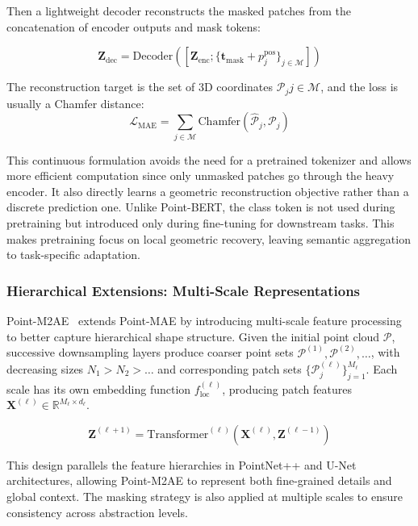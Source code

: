 Then a lightweight decoder reconstructs the masked patches from the concatenation of encoder outputs and mask tokens:

\begin{equation}
  \mathbf{Z}_\text{dec}=\text{Decoder}([\mathbf{Z}_\text{enc}; \{\mathbf{t}_{\text{mask}}+p_j^\text{pos}\}_{j \in \mathcal{M}}])
\end{equation}

The reconstruction target is the set of 3D coordinates ${\mathcal{P}_j}{j \in \mathcal{M}}$, and the loss is usually a Chamfer distance:
\begin{equation}
  \mathcal{L}_{\text{MAE}} = \sum_{j \in \mathcal{M}} \text{Chamfer}(\hat{\mathcal{P}}_j, \mathcal{P}_j)
\end{equation}

This continuous formulation avoids the need for a pretrained tokenizer and allows more efficient computation since only unmasked patches go through the heavy encoder. It also directly learns a geometric reconstruction objective rather than a discrete prediction one. Unlike Point-BERT, the class token is not used during pretraining but introduced only during fine-tuning for downstream tasks. This makes pretraining focus on local geometric recovery, leaving semantic aggregation to task-specific adaptation.

\subsubsection{Hierarchical Extensions: Multi-Scale Representations}
\label{sssec:hierarchical_extensions}

Point-M2AE~\cite{pm2ae} extends Point-MAE by introducing multi-scale feature processing to better capture hierarchical shape structure. Given the initial point cloud $\mathcal{P}$, successive downsampling layers produce coarser point sets $\mathcal{P}^{(1)}, \mathcal{P}^{(2)}, \dots$, with decreasing sizes $N_1 > N_2 > \dots$ and corresponding patch sets $\{ \mathcal{P}^{(\ell)}_j \}_{j=1}^{M_\ell}$. Each scale has its own embedding function $f_{\text{loc}}^{(\ell)}$, producing patch features $\mathbf{X}^{(\ell)} \in \mathbb{R}^{M_\ell \times d_\ell}$.

\begin{equation}
  \mathbf{Z}^{(\ell+1)} = \text{Transformer}^{(\ell)}(\mathbf{X}^{(\ell)},\mathbf{Z}^{(\ell-1)})
\end{equation}

This design parallels the feature hierarchies in PointNet++ and U-Net architectures, allowing Point-M2AE to represent both fine-grained details and global context. The masking strategy is also applied at multiple scales to ensure consistency across abstraction levels.

